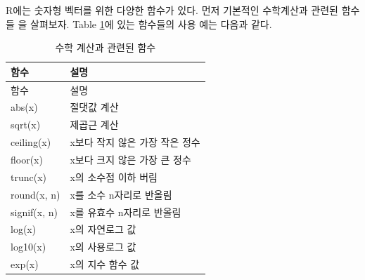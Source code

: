 \documentclass[
]{book}
\begin{document}
R에는 숫자형 벡터를 위한 다양한 함수가 있다. 먼저 기본적인 수학계산과 관련된 함수들
을 살펴보자. Table \ref{tab:math-func}에 있는 함수들의 사용 예는 다음과 같다.

\begin{longtable}[]{@{}ll@{}}
\caption{\label{tab:math-func}수학 계산과 관련된 함수}\tabularnewline
\toprule
함수 & 설명 \\
\midrule
\endfirsthead
\toprule
함수 & 설명 \\
\midrule
\endhead
abs(x) & 절댓값 계산 \\
sqrt(x) & 제곱근 계산 \\
ceiling(x) & x보다 작지 않은 가장 작은 정수 \\
floor(x) & x보다 크지 않은 가장 큰 정수 \\
trunc(x) & x의 소수점 이하 버림 \\
round(x, n) & x를 소수 n자리로 반올림 \\
signif(x, n) & x를 유효수 n자리로 반올림 \\
log(x) & x의 자연로그 값 \\
log10(x) & x의 사용로그 값 \\
exp(x) & x의 지수 함수 값 \\
\bottomrule
\end{longtable}
\end{document}
